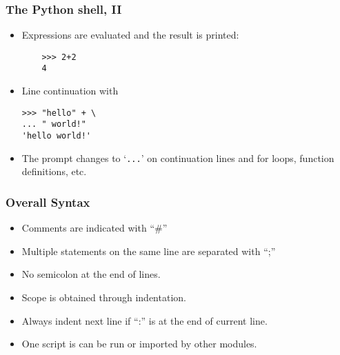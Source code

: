 \begin{frame}[fragile]\frametitle{The Python shell, II}
\begin{itemize}
\item Expressions are evaluated and the result is printed:
	\begin{lstlisting}
	>>> 2+2
	4
	\end{lstlisting}

\item Line continuation with \\ 
\begin{lstlisting}
>>> "hello" + \
... " world!"
'hello world!'
\end{lstlisting}
\item The prompt changes to `\texttt{...}' on continuation lines and for loops, function definitions, etc.
\end{itemize}
\end{frame}

\begin{frame}[fragile]  \frametitle{Overall Syntax}
\begin{itemize}
\item Comments are indicated with ``\#''
\item Multiple statements on the same line are separated with ``;''
\item No semicolon at the end of lines.
\item Scope is obtained through indentation. 
\item Always indent next line if ``:'' is at the end of current line.
\item One script is can be run or imported by other modules.
\end{itemize}
\end{frame}



